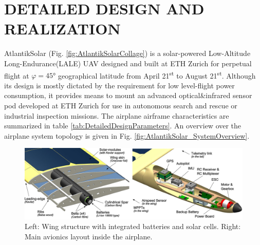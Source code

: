 \section{DETAILED DESIGN AND REALIZATION}

AtlantikSolar (Fig. \ref{fig:AtlantikSolarCollage}) is a solar-powered Low-Altitude Long-Endurance(LALE) UAV designed and built at ETH Zurich for perpetual flight at $\varphi=45°$ geographical latitude from April 21\textsuperscript{st} to August 21\textsuperscript{st}. Although its design is mostly dictated by the requirement for low level-flight power consumption, it provides means to mount an advanced optical\&infrared sensor pod developed at ETH Zurich for use in autonomous search and rescue or industrial inspection missions. The airplane airframe characteristics are summarized in table \ref{tab:DetailedDesignParameters}. An overview over the airplane system topology is given in Fig. \ref{fig:AtlantikSolar_SystemOverview}.

\begin{figure}[h]
    \centering
    \includegraphics[width=\linewidth]{images/10_CAD_AtlantikSolarAvionics_Combined}
    \caption{Left: Wing structure with integrated batteries and solar cells. Right: Main avionics layout inside the airplane.}
    \label{fig:CAD_AtlantikSolarStructureAndAvionics}
\end{figure}

